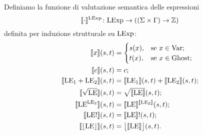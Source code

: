 \begin{definizione} 
Definiamo la funzione di valutazione semantica delle espressioni 
\[
   \mathord{\llbracket \cdot \rrbracket ^{\mathrm{LExp}}}\colon\mathrm{LExp}\to((\Sigma \times \Gamma) \rightarrow \mathbb{Z})
\]
definita per induzione strutturale su $\mathrm{LExp}$:
\begin{align*}
   \llbracket x \rrbracket(s,t)
      &=
        \begin{cases}
                 s(x), &\text{se $x \in \mathrm{Var}$};\\
                 t(x), &\text{se $x \in \mathrm{Ghost}$};
        \end{cases}\\
   \llbracket  c \rrbracket(s,t)
     &=  c;\\
   \llbracket \mathrm{LE}_1 + \mathrm{LE}_2 \rrbracket(s,t)
     &= \llbracket \mathrm{LE}_1 \rrbracket(s,t) + \llbracket \mathrm{LE}_2 \rrbracket(s,t);\\
   \llbracket \sqrt{\mathrm{LE}} \rrbracket(s,t)
     &= \sqrt{\llbracket \mathrm{LE} \rrbracket}(s,t);\\
   \llbracket \mathrm{LE}^{\mathrm{LE}_2} \rrbracket(s,t)
     &= \llbracket \mathrm{LE} \rrbracket^{\llbracket \mathrm{LE}_2 \rrbracket}(s,t);\\
   \llbracket \mathrm{LE}! \rrbracket(s,t)
     &= \llbracket \mathrm{LE} \rrbracket!(s,t);\\
   \llbracket \lfloor \mathrm{LE} \rfloor \rrbracket(s,t)
     &= \bigl \lfloor \llbracket \mathrm{LE} \rrbracket \bigr \rfloor(s,t).
\end{align*}
\end{definizione}


